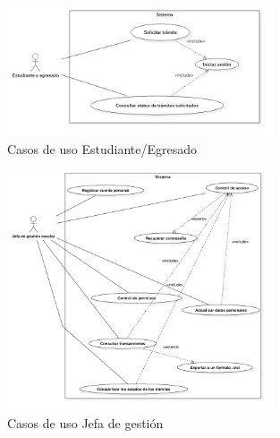 \begin{figure}[htbp!]
    \centering
        \includegraphics[width=0.7\textwidth]{images/img_casos/Estudiante.jpg}
    \caption{Casos de uso Estudiante/Egresado}
\end{figure}


\begin{figure}[htbp!]
    \centering
        \includegraphics[width=0.7\textwidth]{images/img_casos/JefadeGestion.jpg}
    \caption{Casos de uso Jefa de gestión}
\end{figure}